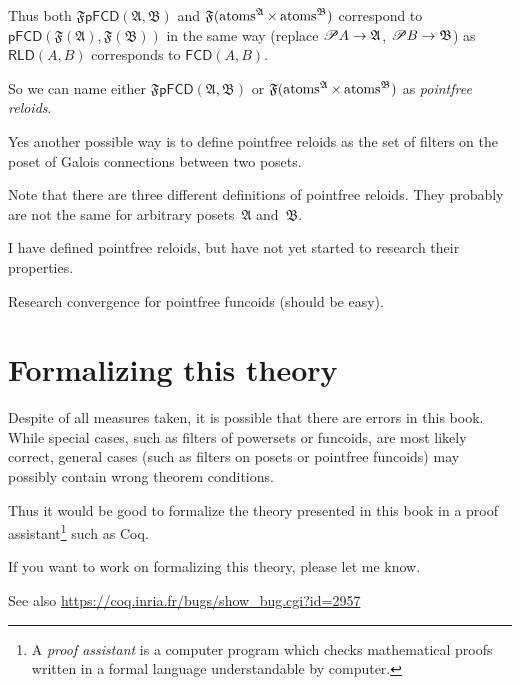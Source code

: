 Thus both $\mathfrak{F}\mathsf{pFCD}(\mathfrak{A},\mathfrak{B})$
and $\mathfrak{F}(\operatorname{atoms}^{\mathfrak{A}}\times\operatorname{atoms}^{\mathfrak{B}})$
correspond to $\mathsf{pFCD}(\mathfrak{F}(\mathfrak{A}),\mathfrak{F}(\mathfrak{B}))$
in the same way (replace $\mathscr{P} A\rightarrow\mathfrak{A}$, $\mathscr{P} B\rightarrow\mathfrak{B}$)
as $\mathsf{RLD}(A,B)$ corresponds to $\mathsf{FCD}(A,B)$.

So we can name either $\mathfrak{F}\mathsf{pFCD}(\mathfrak{A},\mathfrak{B})$
or $\mathfrak{F}(\operatorname{atoms}^{\mathfrak{A}}\times\operatorname{atoms}^{\mathfrak{B}})$
as \emph{pointfree reloids}.

Yes another possible way is to define pointfree reloids as the set of filters on the poset of Galois connections
between two posets.

Note that there are three different definitions of pointfree reloids.
They probably are not the same for arbitrary posets~$\mathfrak{A}$
and~$\mathfrak{B}$.

I have defined pointfree reloids, but have not yet started to research
their properties.

Research convergence for pointfree funcoids (should be easy).


\section{Formalizing this theory}

Despite of all measures taken, it is possible that there are errors
in this book. While special cases, such as filters of powersets or
funcoids, are most likely correct, general cases (such as filters
on posets or pointfree funcoids) may possibly contain wrong theorem
conditions.

Thus it would be good to formalize the theory presented in this book
in a proof assistant\footnote{A \emph{proof assistant} is a computer program which checks mathematical
proofs written in a formal language understandable by computer.} such as Coq.

If you want to work on formalizing this theory, please let me know.

See also \href{https://coq.inria.fr/bugs/show_bug.cgi?id=2957}{https://coq.inria.fr/bugs/show\_{}bug.cgi?id=2957}
